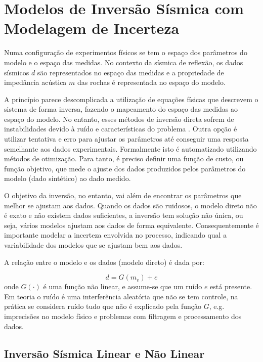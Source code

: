 \chapter{Modelos de Inversão Sísmica com Modelagem de Incerteza}
\label{cap:2modelosInversao}


Numa configuração de experimentos físicos se tem o espaço dos parâmetros do
modelo e o espaço das medidas. No contexto da sísmica de reflexão, os dados
sísmicos $d$ são representados no espaço das medidas e a propriedade de
impedância acústica $m$ das rochas é representada no espaço do modelo.

A princípio parece descomplicada a utilização de equações físicas que descrevem
o sistema de forma inversa, fazendo o mapeamento do espaço das medidas ao espaço
do modelo. No entanto, esses métodos de inversão direta sofrem de instabilidades
devido à ruído e características do problema \citep[p. 50]{sen_livro}. Outra
opção é utilizar tentativa e erro para ajustar os parâmetros até conseguir uma
resposta semelhante aos dados experimentais. Formalmente isto é automatizado
utilizando métodos de otimização. Para tanto, é preciso definir uma função de
custo, ou função objetivo, que mede o ajuste dos dados produzidos pelos
parâmetros do modelo (dado sintético) ao dado medido.

O objetivo da inversão, no entanto, vai além de encontrar os parâmetros que
melhor se ajustam aos dados. Quando os dados são ruidosos, o modelo direto não é
exato e não existem dados suficientes, a inversão tem solução não única, ou
seja, vários modelos ajustam aos dados de forma equivalente. Consequentemente é
importante modelar a incerteza envolvida no processo, indicando qual a
variabilidade dos modelos que se ajustam bem aos dados.

A relação entre o modelo e os dados (modelo direto) é dada por:

\begin{equation}
d = G(m_v) + e
\end{equation}
onde $G(\cdot)$ é uma função não linear, e assume-se que um ruído $e$ está
presente. Em teoria o ruído é uma interferência aleatória que não se tem
controle, na prática se considera ruído tudo que não é explicado pela função
$G$, e.g. imprecisões no modelo físico e problemas com filtragem e processamento
dos dados.

\section{Inversão Sísmica Linear e Não Linear}

